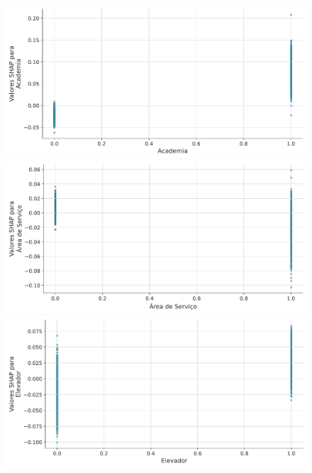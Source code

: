 \documentclass[
  12pt,
  a4paper,
]{scrreprt}
\begin{document}
\begin{figure}

\begin{minipage}{0.33\linewidth}
\includegraphics{TCC_files/mediabag/includes/dependence_plot_cat/dep_plot_academia.pdf}\end{minipage}%
%
\begin{minipage}{0.33\linewidth}
\includegraphics{TCC_files/mediabag/includes/dependence_plot_cat/dep_plot_area_servico.pdf}\end{minipage}%
%
\begin{minipage}{0.33\linewidth}
\includegraphics{TCC_files/mediabag/includes/dependence_plot_cat/dep_plot_elevador.pdf}\end{minipage}%

\end{figure}
\end{document}
